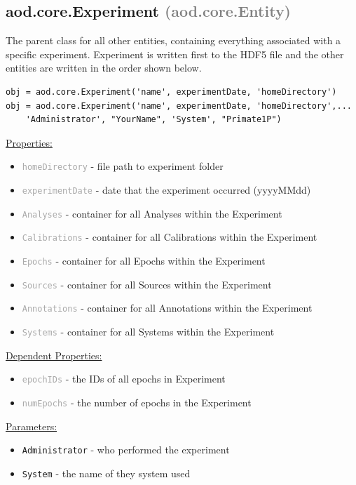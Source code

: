 \documentclass[10pt]{exam}
\newcommand\myparent[1]{\textcolor{gray}{(#1)}}
\newcommand\aodparam[1]{\textcolor{codepurple}{\texttt{#1}}}
\newcommand\aodprop[1]{\textcolor{darkgray}{\texttt{#1}}}
\newcommand\docheader[1]{\vspace{0.6ex}\noindent\underline{#1}\vspace{0.15ex}}
\begin{document}
	\subsection{aod.core.Experiment  \myparent{aod.core.Entity}}
		\noindent The parent class for all other entities, containing everything associated with a specific experiment. Experiment is written first to the HDF5 file and the other entities are written in the order shown below. 
			
		\begin{lstlisting}[style=matlab-editor, basicstyle=\mlttfamily\footnotesize]
obj = aod.core.Experiment('name', experimentDate, 'homeDirectory')
obj = aod.core.Experiment('name', experimentDate, 'homeDirectory',...
	'Administrator', "YourName", 'System', "Primate1P")
		\end{lstlisting}		
		\docheader{Properties:}
		\begin{itemize}
			\item \aodprop{homeDirectory} - file path to experiment folder
			\item \aodprop{experimentDate} - date that the experiment occurred (yyyyMMdd)
			\item \aodprop{Analyses} - container for all Analyses within the Experiment
			\item \aodprop{Calibrations} - container for all Calibrations within the Experiment
			\item \aodprop{Epochs} - container for all Epochs within the Experiment
			\item \aodprop{Sources} - container for all Sources within the Experiment
			\item \aodprop{Annotations} - container for all Annotations within the Experiment
			\item \aodprop{Systems} - container for all Systems within the Experiment
		\end{itemize}		
		\docheader{Dependent Properties:}
		\begin{itemize}
			\item \aodprop{epochIDs} - the IDs of all epochs in Experiment
			\item \aodprop{numEpochs} - the number of epochs in the Experiment
		\end{itemize}
		\docheader{Parameters:}
		\begin{itemize}
			\item \aodparam{Administrator} - who performed the experiment
			\item \aodparam{System} - the name of they system used
		\end{itemize}
\end{document}
